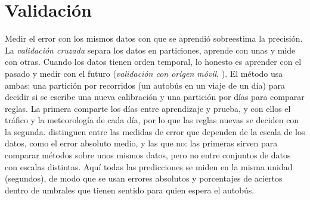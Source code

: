 \section{Validación}
\label{sec:marco-validacion}

Medir el error con los mismos datos con que se aprendió sobreestima la precisión. La \emph{validación cruzada}
\citep{kohavi1995,hastie2009} separa los datos en particiones, aprende con unas y mide con otras. Cuando los datos
tienen orden temporal, lo honesto es aprender con el pasado y medir con el futuro (\emph{validación con origen
móvil}, \citealp{hyndman2021}). El método usa ambas: una partición por recorridos (un autobús en un viaje de un día) para
decidir si se escribe una nueva calibración y una partición por días para comparar reglas. La primera comparte los
días entre aprendizaje y prueba, y con ellos el tráfico y la meteorología de cada día, por lo que las reglas nuevas se
deciden con la segunda. \citet{hyndmankoehler2006} distinguen entre las medidas de
error que dependen de la escala de los datos, como el error absoluto medio, y las que no: las primeras sirven para
comparar métodos sobre unos mismos datos, pero no entre conjuntos de datos con escalas distintas. Aquí todas las
predicciones se miden en la misma unidad (segundos), de modo que se usan errores absolutos y porcentajes de aciertos
dentro de umbrales que tienen sentido para quien espera el autobús.
